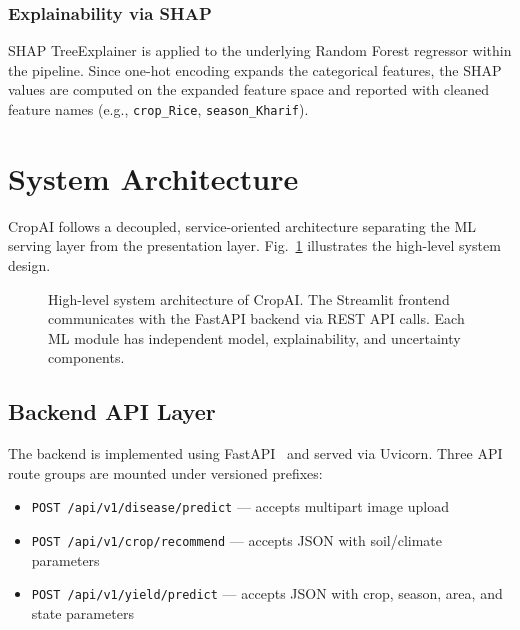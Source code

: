 \documentclass[conference]{IEEEtran}
\begin{document}
\subsubsection{Explainability via SHAP}
SHAP TreeExplainer is applied to the underlying Random Forest regressor within the pipeline. Since one-hot encoding expands the categorical features, the SHAP values are computed on the expanded feature space and reported with cleaned feature names (e.g., \texttt{crop\_Rice}, \texttt{season\_Kharif}).


\section{System Architecture}
\label{sec:architecture}

CropAI follows a decoupled, service-oriented architecture separating the ML serving layer from the presentation layer. Fig.~\ref{fig:architecture} illustrates the high-level system design.

\begin{figure}[htbp]
  \centering
  \caption{High-level system architecture of CropAI. The Streamlit frontend communicates with the FastAPI backend via REST API calls. Each ML module has independent model, explainability, and uncertainty components.}
  \label{fig:architecture}
\end{figure}

\subsection{Backend API Layer}
The backend is implemented using FastAPI~\cite{fastapi2019} and served via Uvicorn. Three API route groups are mounted under versioned prefixes:
\begin{itemize}[leftmargin=*]
  \item \texttt{POST /api/v1/disease/predict} --- accepts multipart image upload
  \item \texttt{POST /api/v1/crop/recommend} --- accepts JSON with soil/climate parameters
  \item \texttt{POST /api/v1/yield/predict} --- accepts JSON with crop, season, area, and state parameters
\end{itemize}
\end{document}
